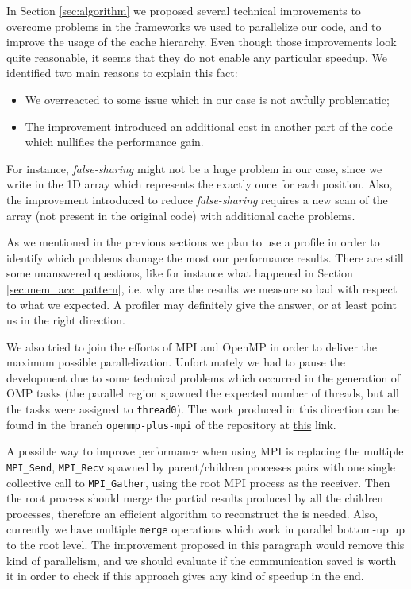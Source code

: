 \documentclass{article}
\begin{document}
In Section \ref{sec:algorithm} we proposed several technical improvements to
overcome problems in the frameworks we used to parallelize our code, and
to improve the usage of the cache hierarchy. Even though those improvements
look quite reasonable, it seems that they do not enable any particular speedup.
We identified two main reasons to explain this fact:
\begin{itemize}
    \item We overreacted to some issue which in our case is not awfully
    problematic;
    \item The improvement introduced an additional cost in another part of the
    code which nullifies the performance gain.
\end{itemize}
For instance, \emph{false-sharing} might not be a huge problem in our case,
since we write in the 1D array which represents the \kdtree{} exactly once for
each position. Also, the improvement introduced to reduce \emph{false-sharing}
requires a new scan of the array (not present in the original code) with
additional cache problems.

As we mentioned in the previous sections we plan to use a profile in order to
identify which problems damage the most our performance results. There are still
some unanswered questions, like for instance what happened in Section
\ref{sec:mem_acc_pattern}, i.e. why are the results we measure so bad with
respect to what we expected. A profiler may definitely give the answer, or at
least point us in the right direction.

We also tried to join the efforts of MPI and OpenMP in order to deliver the
maximum possible parallelization. Unfortunately we had to pause the development
due to some technical problems which occurred in the generation of OMP tasks
(the parallel region spawned the expected number of threads, but all the tasks
were assigned to \texttt{thread0}). The work produced in this direction
can be found in the branch \texttt{openmp-plus-mpi} of the repository at
\href{https://github.com/fAndreuzzi/parallel-kd-tree/tree/openmp-plus-mpi}{this}
link.

A possible way to improve performance when using MPI is replacing the multiple
\texttt{MPI\_Send}, \texttt{MPI\_Recv} spawned by parent/children processes
pairs with one single collective call to \texttt{MPI\_Gather}, using the root
MPI process as the receiver. Then the root process should merge the partial
results produced by all the children processes, therefore an efficient algorithm
to reconstruct the \kdtree{} is needed. Also, currently we have multiple
\texttt{merge} operations which work in parallel bottom-up up to the root level.
The improvement proposed in this paragraph would remove this kind of
parallelism, and we should evaluate if the communication saved is worth it in
order to check if this approach gives any kind of speedup in the end.


\end{document}
